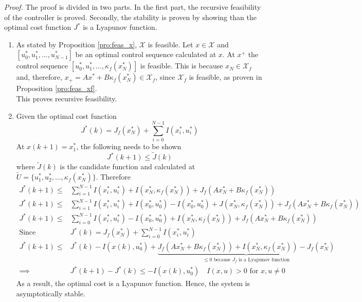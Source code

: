 \textit{Proof.} The proof is divided in two parts. In the first part, the recursive feasibility of the controller is proved. Secondly, the stability is proven by showing than the optimal cost function $J^*$ is a Lyapunov function. 
\begin{enumerate}
	\item As stated by Proposition \ref{pro:feas_x}, $\mathcal{X}$ is feasible. Let $x\in \mathcal{X}$ and $[u^*_0, u^*_1, \dots, u^*_{N-1}]$ be an optimal control sequence calculated at $x$. At $x^+$ the control sequence $[u^*_0, u^*_1, \dots, \kappa_f(x^*_N)]$ is feasible. This is because $x_N\in \mathcal{X}_f$ and, therefore, $x_+=Ax^*+B\kappa_f(x^*_N) \in \mathcal{X}_f$, since $\mathcal{X}_f$ is feasible, as proven in Proposition \ref{pro:feas_xf}.\\
	This proves recursive feasibility.
	\item Given the optimal cost function
	\begin{equation*}
	J^*(k) = J_f(x^*_N)+\sum_{i=0}^{N-1}I(x^*_i, u^*_i)
	\end{equation*}
	At $x(k+1) = x^*_1$, the following needs to be shown
	\begin{equation*}
		J^*(k+1) \leq \widetilde{J}(k)
	\end{equation*}
	where $\widetilde{J}(k)$ is the candidate function and calculated at $\widetilde{U} = \{u^*_1, u^*_2, \dots, \kappa_f(x^*_N)\}$. Therefore
	\begin{align*}
		J^*(k+1) \leq& \sum_{i=1}^{N-1}I(x^*_i, u^*_i) + I(x^*_N, \kappa_f(x^*_N)) + J_f(Ax^*_N + B \kappa_f(x^*_N))\\
		J^*(k+1) \leq& \sum_{i=1}^{N-1}I(x^*_i, u^*_i) +I(x^*_0, u^*_0)-I(x^*_0, u^*_0) + J(x^*_N, \kappa_f(x^*_N)) + J_f(Ax^*_N + B \kappa_f(x^*_N))\\
		J^*(k+1) \leq& \sum_{i=0}^{N-1}I(x^*_i, u^*_i) -I(x^*_0, u^*_0) + I(x^*_N, \kappa_f(x^*_N)) + J_f(Ax^*_N + B \kappa_f(x^*_N))\\
		\text{Since }&J^*(k) = J_f(x^*_N)+\sum_{i=0}^{N-1}I(x^*_i, u^*_i)\\
		J^*(k+1) \leq& J^*(k)  -I(x(k), u^*_0)+  \underset{\leq 0 \text{ because $J_f$ is a Lyapunov function}}{\underbrace{J_f(Ax^*_N + B \kappa_f(x^*_N)) + I(x^*_N, \kappa_f(x^*_N)) - J_f(x^*_N)}}\\
		\implies& J^*(k+1) - J^*(k) \leq -I(x(k), u^*_0) \quad I(x,u) >0 \text{ for }x,u \neq 0
	\end{align*}
	As a result, the optimal cost is a Lyapunov function. Hence, the system is asymptotically stable. 
\end{enumerate}







